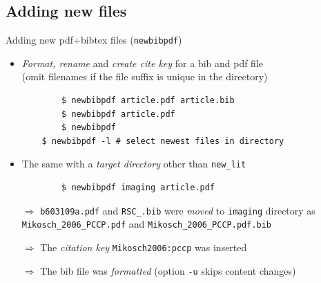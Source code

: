 \documentclass[xcolor={table,dvipsnames}]{beamer}
\renewcommand{\emph}[1]{\textit{\color{orange!90!brown}#1}}
\newcommand{\faint}{\color{black!10!gray}}
\begin{document}
\subsection{Adding new files}
\begin{frame}[fragile]{Adding new pdf+bibtex files (\texttt{newbibpdf})}
  \begin{itemize}

    \item \emph{Format, rename} and \emph{create cite key} for a bib and pdf file\\
      (omit filenames if the file suffix is unique in the directory)
      \begin{lstlisting}
        $ newbibpdf article.pdf article.bib
        $ newbibpdf article.pdf
        $ newbibpdf
	$ newbibpdf -l # select newest files in directory
      \end{lstlisting}

    \item The same with a \emph{target directory} other than \verb!new_lit!
      \begin{lstlisting}
        $ newbibpdf imaging article.pdf
      \end{lstlisting}

    \item[$\Rightarrow$] {\faint\verb!b603109a.pdf!} and {\faint\verb!RSC_.bib!}
      were \emph{moved} to {\faint\verb!imaging!} directory as
      {\faint\verb!Mikosch_2006_PCCP.pdf!} and
      {\faint\verb!Mikosch_2006_PCCP.pdf.bib!}

    \item[$\Rightarrow$] The \emph{citation key} {\faint\verb!Mikosch2006:pccp!} was inserted

    \item[$\Rightarrow$] The bib file was \emph{formatted}
      (option {\faint\verb!-u!} skips content changes)

  \end{itemize}
\end{frame}
\end{document}
